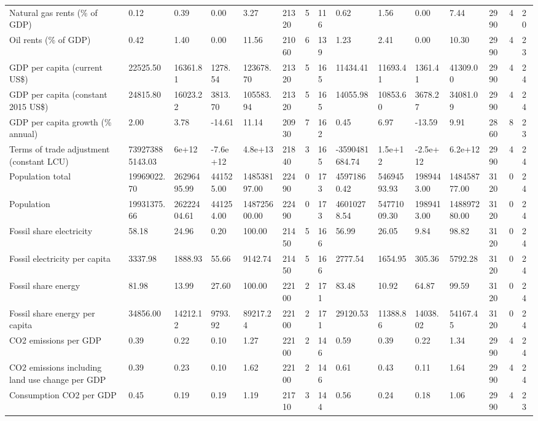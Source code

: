 \begin{longtable}{lllllllllllllll}
\addlinespace
Natural gas rents (\% of GDP) & 0.12 & 0.39 & 0.00 & 3.27 & 21320 & 5 & 116 & 0.62 & 1.56 & 0.00 & 7.44 & 2990 & 4 & 20\\
Oil rents (\% of GDP) & 0.42 & 1.40 & 0.00 & 11.56 & 21060 & 6 & 139 & 1.23 & 2.41 & 0.00 & 10.30 & 2990 & 4 & 23\\
GDP per capita (current US\$) & 22525.50 & 16361.81 & 1278.54 & 123678.70 & 21320 & 5 & 165 & 11434.41 & 11693.41 & 1361.41 & 41309.00 & 2990 & 4 & 24\\
GDP per capita (constant 2015 US\$) & 24815.80 & 16023.22 & 3813.70 & 105583.94 & 21320 & 5 & 165 & 14055.98 & 10853.60 & 3678.27 & 34081.09 & 2990 & 4 & 24\\
GDP per capita growth (\% annual) & 2.00 & 3.78 & -14.61 & 11.14 & 20930 & 7 & 162 & 0.45 & 6.97 & -13.59 & 9.91 & 2860 & 8 & 23\\
\addlinespace
Terms of trade adjustment (constant LCU) & 739273885143.03 & 6e+12 & -7.6e+12 & 4.8e+13 & 21840 & 3 & 165 & -3590481684.74 & 1.5e+12 & -2.5e+12 & 6.2e+12 & 2990 & 4 & 24\\
Population total & 19969022.70 & 26296495.99 & 441525.00 & 148538197.00 & 22490 & 0 & 173 & 45971860.42 & 54694593.93 & 1989443.00 & 148458777.00 & 3120 & 0 & 24\\
Population & 19931375.66 & 26222404.61 & 441254.00 & 148725600.00 & 22490 & 0 & 173 & 46010278.54 & 54771009.30 & 1989413.00 & 148897280.00 & 3120 & 0 & 24\\
Fossil share electricity & 58.18 & 24.96 & 0.20 & 100.00 & 21450 & 5 & 166 & 56.99 & 26.05 & 9.84 & 98.82 & 3120 & 0 & 24\\
Fossil electricity per capita & 3337.98 & 1888.93 & 55.66 & 9142.74 & 21450 & 5 & 166 & 2777.54 & 1654.95 & 305.36 & 5792.28 & 3120 & 0 & 24\\
\addlinespace
Fossil share energy & 81.98 & 13.99 & 27.60 & 100.00 & 22100 & 2 & 171 & 83.48 & 10.92 & 64.87 & 99.59 & 3120 & 0 & 24\\
Fossil share energy per capita & 34856.00 & 14212.12 & 9793.92 & 89217.24 & 22100 & 2 & 171 & 29120.53 & 11388.86 & 14038.02 & 54167.45 & 3120 & 0 & 24\\
CO2 emissions per GDP & 0.39 & 0.22 & 0.10 & 1.27 & 22100 & 2 & 146 & 0.59 & 0.39 & 0.22 & 1.34 & 2990 & 4 & 24\\
CO2 emissions including land use change per GDP & 0.39 & 0.23 & 0.10 & 1.62 & 22100 & 2 & 146 & 0.61 & 0.43 & 0.11 & 1.64 & 2990 & 4 & 24\\
Consumption CO2 per GDP & 0.45 & 0.19 & 0.19 & 1.19 & 21710 & 3 & 144 & 0.56 & 0.24 & 0.18 & 1.06 & 2990 & 4 & 23\\

\end{longtable}
